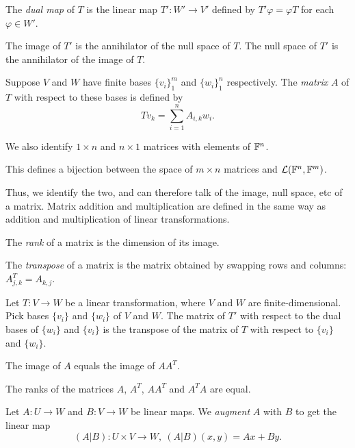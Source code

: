 \begin{defn}
  The \emph{dual map} of $T$ is the linear map $T':W'\to V'$ defined by
  $T'\varphi=\varphi T$ for each $\varphi\in W'$.
\end{defn}
\begin{prop}
    The image of $T'$ is the annihilator of the null space of $T$. The null
    space of $T'$ is the annihilator of the image of $T$.
\end{prop}
\begin{defn}
  Suppose $V$ and $W$ have finite bases $\{v_i\}_1^m$ and $\{w_i\}_1^n$
  respectively. The \emph{matrix} $A$ of $T$ with respect to these bases is
  defined by
  \[Tv_k=\sum_{i=1}^n A_{i,k}w_i.\]

  We also identify $1\times n$ and $n\times 1$ matrices with elements of
  $\mathbb{F}^n$.
\end{defn}
\begin{prop}
  This defines a bijection between the space of $m\times n$ matrices and
  $\mathcal L(\mathbb{F}^n,\mathbb{F}^m)$.
\end{prop}
\begin{defn}
  Thus, we identify the two, and can therefore talk of the image, null space,
  etc of a matrix.
  Matrix addition and multiplication are defined in the same way as addition and
  multiplication of linear transformations.
\end{defn}
\begin{defn}
  The \emph{rank} of a matrix is the dimension of its image.

  The \emph{transpose} of a matrix is the matrix obtained by swapping rows and
  columns: $A^T_{j,k}=A_{k,j}$.
\end{defn}
\begin{prop}
  Let $T:V\to W$ be a linear transformation, where $V$ and $W$ are
  finite-dimensional. Pick bases $\{v_i\}$ and $\{w_i\}$ 
  of $V$ and $W$. The matrix of $T'$ with respect
  to the dual bases of $\{w_i\}$ and $\{v_i\}$ 
  is the transpose of the matrix of $T$ with respect to $\{v_i\}$ and $\{w_i\}$.
\end{prop}
\begin{prop}
    The image of $A$ equals the image of $AA^T$.
\end{prop}
\begin{cor}
    The ranks of the matrices $A$, $A^T$, $AA^T$ and $A^T A$ are equal.
\end{cor}
\begin{defn}
  Let $A:U\to W$ and
  $B:V\to W$ be linear maps. We \emph{augment} $A$ with $B$ to get the linear
  map
  \[(A|B):U\times V\to W,\ (A|B)(x,y)=Ax+By.\]
\end{defn}

